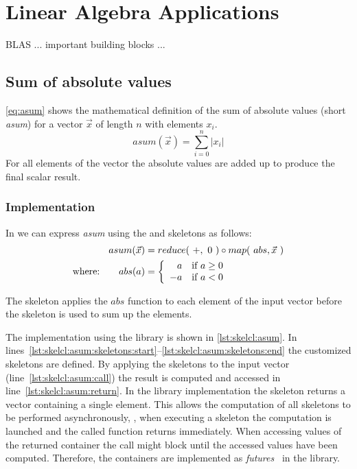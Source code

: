 \section{Linear Algebra Applications}

BLAS ... important building blocks ...

\subsection{Sum of absolute values}
\label{sec:asum}
\autoref{eq:asum} shows the mathematical definition of the sum of absolute values (short \emph{asum}) for a vector $\vec{x}$ of length $n$ with elements $x_i$.
\begin{equation}
  asum(\vec{x}) = \sum_{i=0}^{n} | x_i |
  \label{eq:asum}
\end{equation}
For all elements of the vector the absolute values are added up to produce the final scalar result.

\subsubsection*{\SkelCL Implementation}
In \SkelCL we can express \emph{asum} using the \map and \reduce skeletons as follows:
\begin{align}
  asum(\vec{x}) &= reduce(\ +,\ 0\ ) \circ map(\ abs, \vec{x}\ )\\
  \text{where:} \qquad abs(a) &=
    \left\{
      \begin{array}{r l}
      a & \text{if } a \geq 0\\
      -a & \text{if } a < 0
      \end{array}
    \right.\nonumber
\end{align}

The \map skeleton applies the $abs$ function to each element of the input vector before the \reduce skeleton is used to sum up the elements.

The implementation using the \SkelCL library is shown in \autoref{lst:skelcl:asum}.
In lines~\ref{lst:skelcl:asum:skeletons:start}--\ref{lst:skelcl:asum:skeletons:end} the customized skeletons are defined.
By applying the skeletons to the input vector (line~\ref{lst:skelcl:asum:call}) the result is computed and accessed in line~\ref{lst:skelcl:asum:return}.
In the \SkelCL library implementation the \reduce skeleton returns a vector containing a single element.
This allows the computation of all skeletons to be performed asynchronously, \ie, when executing a skeleton the computation is launched and the called function returns immediately.
When accessing values of the returned container the call might block until the accessed values have been computed.
Therefore, the containers are implemented as \emph{futures}~\cite{HewittBa1977,FriedmanWi1978} in the \SkelCL library.

